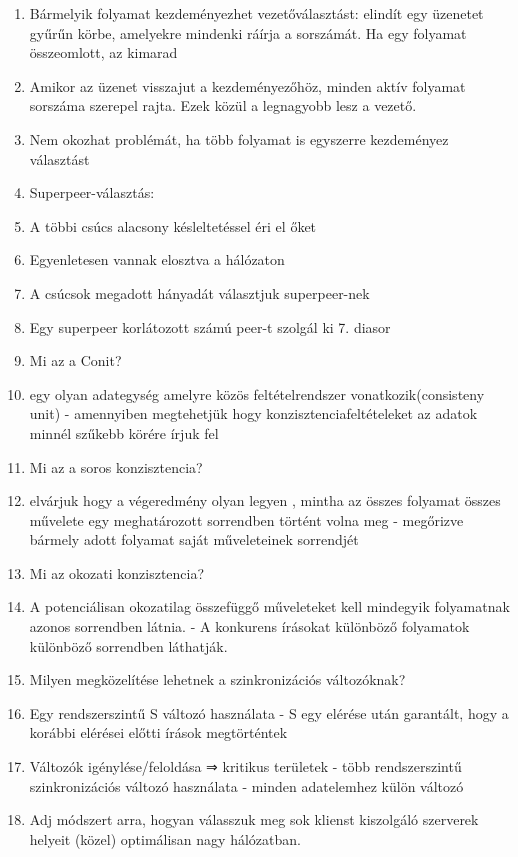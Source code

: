 \documentclass[twoside, a4paper, 12pt]{article}
\begin{document}
\begin{enumerate}
    \item Bármelyik folyamat kezdeményezhet vezetőválasztást: elindít egy üzenetet gyűrűn körbe, amelyekre mindenki ráírja a sorszámát.
        Ha egy folyamat összeomlott, az kimarad
    \item Amikor az üzenet visszajut a kezdeményezőhöz, minden aktív folyamat sorszáma szerepel rajta. Ezek közül a legnagyobb lesz a vezető.
    \item Nem okozhat problémát, ha több folyamat is egyszerre kezdeményez választást	
    \item  Superpeer-választás:
    \item A többi csúcs alacsony késleltetéssel éri el őket
    \item Egyenletesen vannak elosztva a hálózaton
    \item A csúcsok megadott hányadát választjuk superpeer-nek
    \item Egy superpeer korlátozott számú peer-t szolgál ki
        7. diasor
    \item  Mi az a Conit?
    \item egy olyan adategység amelyre közös feltételrendszer vonatkozik(consisteny unit)
        - amennyiben megtehetjük hogy konzisztenciafeltételeket az adatok minnél szűkebb körére írjuk fel
    \item  Mi az a soros konzisztencia?
    \item elvárjuk hogy a végeredmény olyan legyen , mintha az összes folyamat összes művelete
        egy meghatározott sorrendben történt volna meg
        - megőrizve bármely adott folyamat saját műveleteinek sorrendjét
    \item  Mi az okozati konzisztencia?
    \item A potenciálisan okozatilag összefüggő műveleteket kell mindegyik folyamatnak azonos sorrendben látnia.
        - A konkurens írásokat különböző folyamatok különböző sorrendben láthatják.
    \item  Milyen megközelítése lehetnek a szinkronizációs változóknak?
    \item Egy rendszerszintű S változó használata
        - S egy elérése után garantált, hogy a korábbi elérései előtti írások megtörténtek
    \item Változók  igénylése/feloldása ⇒ kritikus területek
        - több rendszerszintű szinkronizációs változó használata
        - minden adatelemhez külön változó
    \item  Adj módszert arra, hogyan válasszuk meg sok klienst kiszolgáló szerverek helyeit (közel) optimálisan nagy hálózatban.

\end{enumerate}
\end{document}
